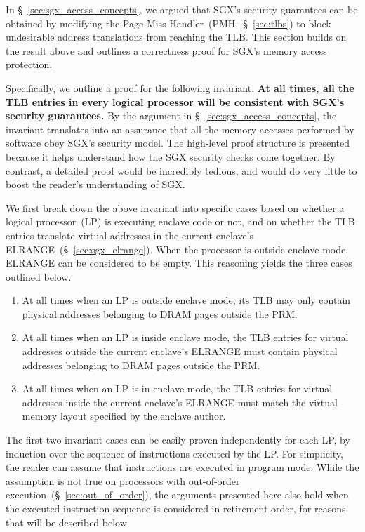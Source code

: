 \label{sec:sgx_access_correctness}

In \S~\ref{sec:sgx_access_concepts}, we argued that SGX's security guarantees
can be obtained by modifying the Page Miss Handler~(PMH,~\S~\ref{sec:tlbs}) to
block undesirable address translations from reaching the TLB. This section
builds on the result above and  outlines a correctness proof for SGX's memory
access protection.

Specifically, we outline a proof for the following invariant. \textbf{At all
times, all the TLB entries in every logical processor will be consistent with
SGX's security guarantees.} By the argument in
\S~\ref{sec:sgx_access_concepts}, the invariant translates into an assurance
that all the memory accesses performed by software obey SGX's security model.
The high-level proof structure is presented because it helps understand how the
SGX security checks come together. By contrast, a detailed proof would be
incredibly tedious, and would do very little to boost the reader's understanding
of SGX.



We first break down the above invariant into specific cases based on whether
a logical processor~(LP) is executing enclave code or not, and on whether the
TLB entries translate virtual addresses in the current enclave's
ELRANGE~(\S~\ref{sec:sgx_elrange}). When the processor is outside enclave mode,
ELRANGE can be considered to be empty. This reasoning yields the three cases
outlined below.

\begin{enumerate}
\item At all times when an LP is outside enclave mode, its TLB may only contain
  physical addresses belonging to DRAM pages outside the PRM.
\item At all times when an LP is inside enclave mode, the TLB entries for
  virtual addresses outside the current enclave's ELRANGE must contain physical
  addresses belonging to DRAM pages outside the PRM.
\item At all times when an LP is in enclave mode, the TLB entries for virtual
  addresses inside the current enclave's ELRANGE must match the virtual memory
  layout specified by the enclave author.
\end{enumerate}

The first two invariant cases can be easily proven independently for each LP,
by induction over the sequence of instructions executed by the LP. For
simplicity, the reader can assume that instructions are executed in program
mode. While the assumption is not true on processors with out-of-order
execution~(\S~\ref{sec:out_of_order}), the arguments presented here also hold
when the executed instruction sequence is considered in retirement order, for
reasons that will be described below.


